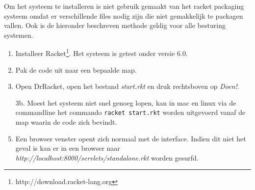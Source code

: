 \documentclass{article}
\begin{document}
Om het systeem te installeren is niet gebruik gemaakt van het racket packaging systeem omdat er verschillende files nodig zijn die niet gemakkelijk te packagen vallen. Ook is de hieronder beschreven methode geldig voor alle besturing systemen.
\begin{enumerate}
	\item Installeer Racket\footnote{http://download.racket-lang.org}. Het systeem is getest onder versie 6.0.
	\item Pak de code uit naar een bepaalde map.
	\item Open DrRacket, open het bestand \emph{start.rkt} en druk rechtsboven op \emph{Doen!}. 
	\item[3b.] Moest het systeem niet snel genoeg lopen, kan in mac en linux via de commandline het commando \lstinline|racket start.rkt| worden uitgevoerd vanaf de map waarin de code zich bevindt. 
	\item Een browser venster opent zich normaal met de interface. Indien dit niet het geval is kan er in een browser naar\\ \emph{http://localhost:8000/servlets/standalone.rkt} worden gesurfd.
\end{enumerate}
\end{document}

